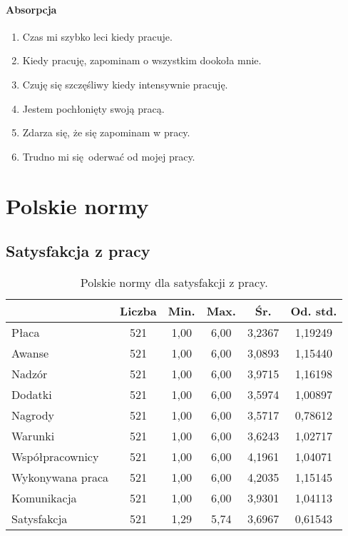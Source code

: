 \paragraph{Absorpcja}
\begin{enumerate}
  \item Czas mi szybko leci kiedy pracuje.
  \item Kiedy pracuję, zapominam o wszystkim dookoła mnie.
  \item Czuję się szczęśliwy kiedy intensywnie pracuję.
  \item Jestem pochłonięty swoją pracą.
  \item Zdarza się, że się zapominam w pracy.
  \item Trudno mi się oderwać od mojej pracy.
\end{enumerate}
\cleardoublepage
\section{Polskie normy}
\subsection{Satysfakcja z pracy}
\label{sec:app-jss-norms}

\begin{table}[h!]
\begin{center}
\begin{tabular}{l | c c c c c}
  & Liczba & Min. & Max. & Śr. & Od. std. \\ \hline
Płaca & 521 & 1,00 & 6,00 & 3,2367 & 1,19249 \\
Awanse & 521 & 1,00 & 6,00 & 3,0893 & 1,15440 \\ 
Nadzór &  521 & 1,00 & 6,00 & 3,9715 & 1,16198 \\
Dodatki &  521 & 1,00 & 6,00 & 3,5974 & 1,00897 \\
Nagrody &  521 & 1,00 & 6,00 & 3,5717 & 0,78612 \\
Warunki &  521 & 1,00 & 6,00 & 3,6243 & 1,02717 \\
Współpracownicy &  521 & 1,00 & 6,00 & 4,1961 & 1,04071 \\
Wykonywana praca &  521 & 1,00 & 6,00 & 4,2035 & 1,15145 \\
Komunikacja & 521 & 1,00 & 6,00 & 3,9301 & 1,04113 \\ \hline
Satysfakcja & 521 & 1,29 & 5,74 & 3,6967 & 0,61543 \\
\end{tabular}
\end{center}
\caption{Polskie normy dla satysfakcji z pracy.}
\label{tab:jss-pl-norms}
\end{table}


